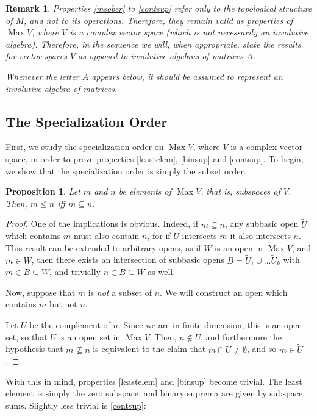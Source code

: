 \documentclass{article}
\theoremstyle{plain}
\newtheorem{prop}{Proposition}
\newtheorem*{remark}{Remark}
\theoremstyle{nonumberplain}
\newtheorem{proof}{Proof}
\DeclareMathOperator{\Max}{Max}
\begin{document}
\begin{remark}
Properties \ref{msober} to \ref{contsup} refer only to the topological structure of $M$, and not to its operations. Therefore, they remain valid as properties of $\Max V$, where $V$ is a complex vector space (which is not necessarily an involutive algebra). Therefore, in the sequence we will, when appropriate, state the results for vector spaces $V$ as opposed to involutive algebras of matrices $A$.

Whenever the letter $A$ appears below, it should be assumed to represent an involutive algebra of matrices.
\end{remark}

\subsection{The Specialization Order}

First, we study the specialization order on $\Max V$, where $V$ is a complex vector space, in order to prove properties \ref{leastelem}, \ref{binsup} and \ref{contsup}. To begin, we show that the specialization order is simply the subset order.

\begin{prop}
Let $m$ and $n$ be elements of $\Max V$, that is, subspaces of $V$. Then, $m \leq n$ iff $m \subseteq n$.
\end{prop}

\begin{proof}
One of the implications is obvious. Indeed, if $m \subseteq n$, any subbasic open $\tilde U$ which contains $m$ must also contain $n$, for if $U$ intersects $m$ it also intersects $n$. This result can be extended to arbitrary opens, as if $W$ is an open in $\Max V$, and $m \in W$, then there exists an intersection of subbasic opens $B = \tilde U_1 \cup \dots \tilde U_k$ with $m \in B \subseteq W$, and trivially $n \in B \subseteq W$ as well.

Now, suppose that $m$ is \emph{not} a subset of $n$. We will construct an open which contains $m$ but not $n$.

Let $U$ be the complement of $n$. Since we are in finite dimension, this is an open set, so that $\tilde U$ is an open set in $\Max V$. Then, $n \not \in \tilde U$, and furthermore the hypothesis that $m \nsubseteq n$ is equivalent to the claim that $m \cap U \neq \emptyset$, and so $m \in \tilde U$.
\end{proof}

With this in mind, properties \ref{leastelem} and \ref{binsup} become trivial. The least element is simply the zero subspace, and binary suprema are given by subspace sums. Slightly less trivial is \ref{contsup}:
\end{document}
